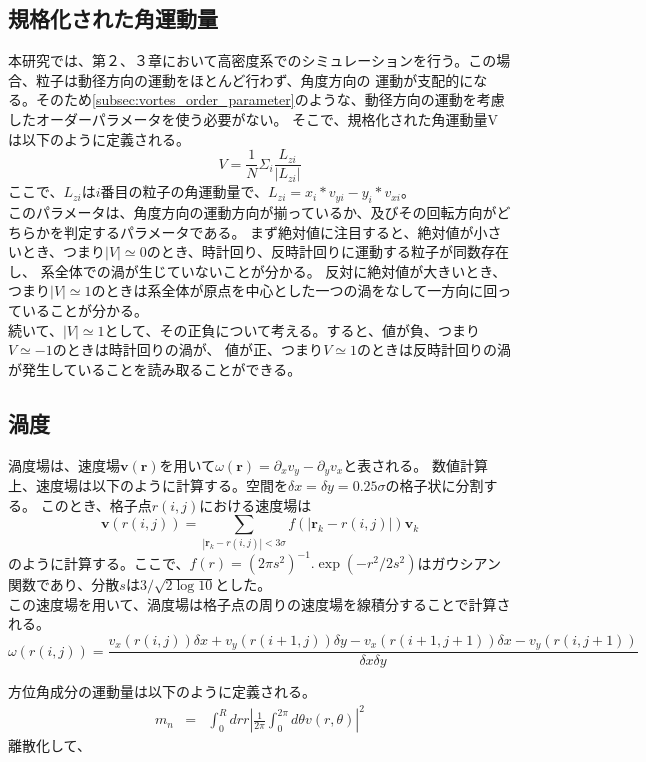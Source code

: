 \documentclass[/Users/ikedahajime/GitHub/reserch/master_report/thesis]{subfiles}
\begin{document}
\subsection{規格化された角運動量}
本研究では、第２、３章において高密度系でのシミュレーションを行う。この場合、粒子は動径方向の運動をほとんど行わず、角度方向の
運動が支配的になる。そのため\ref{subsec:vortes_order_parameter}のような、動径方向の運動を考慮したオーダーパラメータを使う必要がない。
そこで、規格化された角運動量V\cite{jiangEmergenceCollectiveDynamical2017}\cite{capriniCollectiveEffectsConfined2021}は以下のように定義される。
\begin{equation}
    V=\frac{1}{N}\Sigma_i \frac{L_{zi}}{ |L_{zi}|}
\end{equation}
ここで、$L_{zi}$は$i$番目の粒子の角運動量で、$L_{zi}=x_i*v_{yi}-y_i*v_{xi}$。\\
このパラメータは、角度方向の運動方向が揃っているか、及びその回転方向がどちらかを判定するパラメータである。
まず絶対値に注目すると、絶対値が小さいとき、つまり$|V|\simeq 0$のとき、時計回り、反時計回りに運動する粒子が同数存在し、
系全体での渦が生じていないことが分かる。
反対に絶対値が大きいとき、つまり$|V|\simeq 1$のときは系全体が原点を中心とした一つの渦をなして一方向に回っていることが分かる。\\
続いて、$|V|\simeq 1$として、その正負について考える。すると、値が負、つまり$V\simeq -1$のときは時計回りの渦が、
値が正、つまり$V\simeq 1$のときは反時計回りの渦が発生していることを読み取ることができる。

\subsection{渦度}
渦度場は、速度場$\bm{v}(\bm{r})$を用いて$\omega(\bm{r})=\partial_x v_y -\partial_y v_x$と表される。
数値計算上、速度場は以下のように計算する。空間を$\delta x=\delta y=0.25 \sigma$の格子状に分割する。
このとき、格子点$r(i,j)$における速度場は%
\begin{equation}
    \bm{v}(r(i,j))=\sum_{\left|\bm{r}_k-r(i,j)\right|<3\sigma} f(\left|\bm{r}_k-r(i,j)\right|)\bm{v}_k
\end{equation}
のように計算する。ここで、$f(r)=(2\pi s^2)^{-1}. \exp(-r^2/2s^2)$はガウシアン関数であり、分散$s$は$3/\sqrt{2\log 10}$とした。\\
この速度場を用いて、渦度場は格子点の周りの速度場を線積分することで計算される。
\begin{equation}
    \omega (r(i,j))=\frac{v_x(r(i,j))\delta x +v_y(r(i+1,j)) \delta y -v_x(r(i+1,j+1))\delta x -v_y(r(i,j+1))}{\delta x \delta y}
\end{equation}


方位角成分の運動量は以下のように定義される。
\begin{eqnarray}
    m_n &=& \int_0^R dr r\left|\frac{1}{2\pi}\int_0^{2\pi}d\theta v(r,\theta)\right|^2
\end{eqnarray}
離散化して、
\ifSubfilesClassLoaded{
    \printbibliography[title=参考文献]
    }{}
\end{document}
